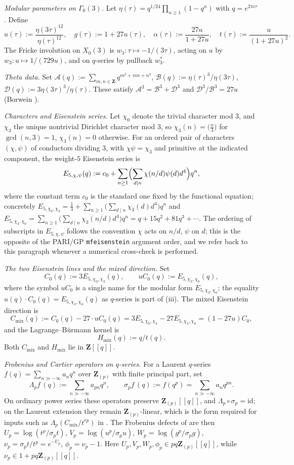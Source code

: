 \documentclass[11pt]{amsart}
\theoremstyle{definition}
\theoremstyle{remark}
\newcommand{\Z}{\mathbf{Z}}
\begin{document}
\emph{Modular parameters on $\Gamma_0(3)$.} Let $\eta(\tau)=q^{1/24}\prod_{n\ge 1}(1-q^n)$ with $q=e^{2\pi i\tau}$. Define
\[
u(\tau):=\frac{\eta(3\tau)^{12}}{\eta(\tau)^{12}},\quad
g(\tau):=1+27u(\tau),\quad
\alpha(\tau):=\frac{27u}{1+27u},\quad
t(\tau):=\frac{u}{(1+27u)^2}.
\]
The Fricke involution on $X_0(3)$ is $w_3:\tau\mapsto -1/(3\tau)$, acting on $u$ by $w_3:u\mapsto 1/(729u)$, and on $q$-series by pullback $w_3^*$.

\emph{Theta data.} Set $\mathcal A(q):=\sum_{m,n\in\Z}q^{m^2+mn+n^2}$, $\mathcal B(q):=\eta(\tau)^3/\eta(3\tau)$, $\mathcal D(q):=3\eta(3\tau)^3/\eta(\tau)$. These satisfy $\mathcal A^3=\mathcal B^3+\mathcal D^3$ and $\mathcal D^3/\mathcal B^3=27u$ (Borwein \cite{BBG}).

\emph{Characters and Eisenstein series.} Let $\chi_0$ denote the trivial character mod $3$, and $\chi_3$ the unique nontrivial Dirichlet character mod $3$, so $\chi_3(n)=\bigl(\tfrac{n}{3}\bigr)$ for $\gcd(n,3)=1$, $\chi_3(n)=0$ otherwise. For an ordered pair of characters $(\chi,\psi)$ of conductors dividing $3$, with $\chi\psi=\chi_3$ and primitive at the indicated component, the weight-$5$ Eisenstein series is
\[
E_{5,\chi,\psi}(q):=c_0+\sum_{n\ge 1}\Bigl(\sum_{d\mid n}\chi(n/d)\psi(d)d^4\Bigr)q^n,
\]
where the constant term $c_0$ is the standard one fixed by the functional equation; concretely $E_{5,\chi_0,\chi_3}=\tfrac{1}{3}+\sum_{n\ge 1}\bigl(\sum_{d\mid n}\chi_3(d)d^4\bigr)q^n$ and $E_{5,\chi_3,\chi_0}=\sum_{n\ge 1}\bigl(\sum_{d\mid n}\chi_3(n/d)d^4\bigr)q^n=q+15q^2+81q^3+\cdots$. The ordering of subscripts in $E_{5,\chi,\psi}$ follows the convention $\chi$ acts on $n/d$, $\psi$ on $d$; this is the opposite of the PARI/GP \verb|mfeisenstein| argument order, and we refer back to this paragraph whenever a numerical cross-check is performed.
 
\emph{The two Eisenstein lines and the mixed direction.} Set
\[
C_0(q):=3E_{5,\chi_0,\chi_3}(q),\qquad uC_0(q):=E_{5,\chi_3,\chi_0}(q),
\]
where the symbol $uC_0$ is a single name for the modular form $E_{5,\chi_3,\chi_0}$; the equality $u(q)\cdot C_0(q)=E_{5,\chi_3,\chi_0}(q)$ as $q$-series is part of (iii). The mixed Eisenstein direction is
\[
C_{\mathrm{mix}}(q):=C_0(q)-27\cdot uC_0(q)=3E_{5,\chi_0,\chi_3}-27E_{5,\chi_3,\chi_0}=(1-27u)C_0,
\]
and the Lagrange--B\"urmann kernel is
\[
H_{\mathrm{mix}}(q):=q/t(q).
\]
Both $C_{\mathrm{mix}}$ and $H_{\mathrm{mix}}$ lie in $\Z[[q]]$.

\emph{Frobenius and Cartier operators on $q$-series.} For a Laurent $q$-series $f(q)=\sum_{n\gg-\infty}a_nq^n$ over $\Z_{(p)}$ with finite principal part, set
\[
\Lambda_p f\,(q):=\sum_{n\gg-\infty}a_{pn}q^n,\qquad
\sigma_p f\,(q):=f(q^p)=\sum_{n\gg-\infty}a_nq^{pn}.
\]
On ordinary power series these operators preserve $\Z_{(p)}[[q]]$, and $\Lambda_p\circ\sigma_p=\mathrm{id}$; on the Laurent extension they remain $\Z_{(p)}$-linear, which is the form required for inputs such as $\Lambda_p(C_{\mathrm{mix}}/t^{rp})$ in . The Frobenius defects of  are then $U_p=\log(t^p/\sigma_p t)$, $V_p=\log(u^p/\sigma_p u)$, $W_p=\log(g^p/\sigma_p g)$, $\nu_p=\sigma_p t/t^p=e^{-U_p}$, $\phi_p=\nu_p-1$. Here $U_p,V_p,W_p,\phi_p\in pq\Z_{(p)}[[q]]$, while $\nu_p\in 1+pq\Z_{(p)}[[q]]$.
\end{document}
